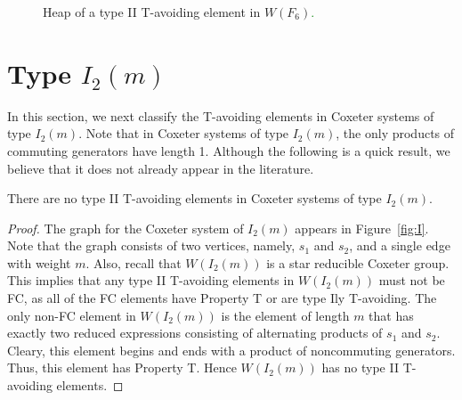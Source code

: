 \begin{figure}[h!]\centering
{}
\caption{Heap of a type II T-avoiding element in $W(F_6)$\textcolor{green}{.}}\label{fig:f6bat}
\end{figure}


\section{Type $I_2(m)$}\label{sec:tavoidI}

In this section, we next classify the T-avoiding elements in Coxeter systems of type $I_2(m)$. Note that in Coxeter systems of type $I_2(m)$, the only products of commuting generators have length 1. Although the following is a quick result, we believe that it does not already appear in the literature.
\begin{theorem}
There are no type II T-avoiding elements in Coxeter systems of type $I_2(m)$.
\begin{proof}
	The graph for the Coxeter system of $I_2(m)$ appears in Figure~\ref{fig:I}. Note that the graph consists of two vertices, namely, $s_1$ and $s_2$, and a single edge with weight $m$. Also, recall that $W(I_2(m))$ is a star reducible Coxeter group. This implies that any type II T-avoiding elements in $W(I_2(m))$ must not be FC, as all of the FC elements have Property T or are type Ily T-avoiding. The only non-FC element in $W(I_2(m))$ is the element of length $m$ that has exactly two reduced expressions consisting of alternating products of $s_1$ and $s_2$. Cleary, this element begins and ends with a product of noncommuting generators. Thus, this element has Property T. Hence $W(I_2(m))$ has no type II T-avoiding elements. 
\end{proof}	
\end{theorem}
 



